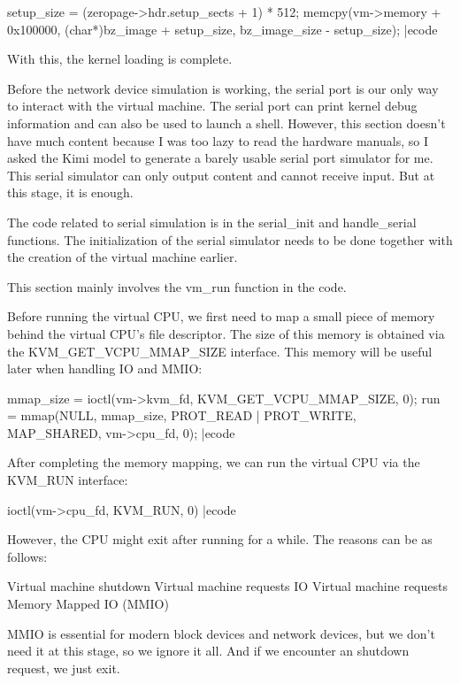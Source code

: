\bcode
setup_size = (zeropage->hdr.setup_sects + 1) * 512;
memcpy(vm->memory + 0x100000,
       (char*)bz_image + setup_size,
       bz_image_size - setup_size);
|ecode

With this, the kernel loading is complete.


Before the network device simulation is working, the serial port is our only way to interact with the virtual machine. The serial port can print kernel debug information and can also be used to launch a  shell. However, this section doesn't have much content because I was too lazy to read the hardware manuals, so I asked the  Kimi model to generate a barely usable serial port simulator for me. This serial simulator can only output content and cannot receive input. But at this stage, it is enough.

The code related to serial simulation is in the  {\itt serial\_init} and  {\itt handle\_serial} functions. The initialization of the serial simulator needs to be done together with the creation of the virtual machine earlier.


This section mainly involves the  {\itt vm\_run} function in the code.

Before running the virtual  CPU, we first need to map a small piece of memory behind the virtual  CPU's file descriptor. The size of this memory is obtained via the  {\itt KVM\_GET\_VCPU\_MMAP\_SIZE} interface. This memory will be useful later when handling  IO and  MMIO:

\bcode
mmap_size = ioctl(vm->kvm_fd, KVM_GET_VCPU_MMAP_SIZE, 0);
run = mmap(NULL, mmap_size, PROT_READ | PROT_WRITE,
           MAP_SHARED, vm->cpu_fd, 0);
|ecode

After completing the memory mapping, we can run the virtual  CPU via the  {\itt KVM\_RUN} interface:

\bcode
ioctl(vm->cpu_fd, KVM_RUN, 0)
|ecode

However, the  CPU might exit after running for a while. The reasons can be as follows:

\bli
\li Virtual machine shutdown
\li Virtual machine requests  IO
\li Virtual machine requests Memory Mapped  IO (MMIO)
\eli

MMIO is essential for modern block devices and network devices, but we don't need it at this stage, so we ignore it all. And if we encounter an shutdown request, we just exit.

